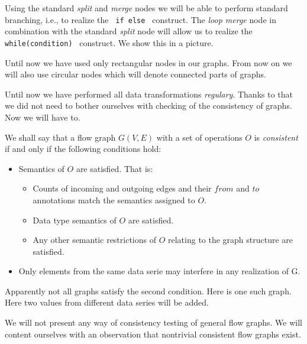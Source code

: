 Using the standard \emph{split} and \emph{merge} nodes we will be able to perform standard branching, i.e., to realize the \texttt{ if \string{\string} else \string{\string} } construct. The \emph{loop merge} node in combination with the standard \emph{split} node will allow us to realize the \texttt{ while(condition) \string{\string} } construct. We show this in a picture.

\begin{rem}
  Until now we have used only rectangular nodes in our graphs. From now on we will also use circular nodes which will denote connected parts of graphs.
\end{rem}


Until now we have performed all data transformations \emph{regulary}. Thanks to that we did not need to bother ourselves with checking of the consistency of graphs. Now we will have to.

\begin{define}
  We shall say that a flow graph $G(V,E)$ with a set of operations $O$ is \emph{consistent} if and only if the following conditions hold:
  \begin{itemize}
    \item Semantics of $O$ are satisfied. That is:
      \begin{itemize}
        \item Counts of incoming and outgoing edges and their $from$ and $to$ annotations match the semantics assigned to $O$.
        \item Data type semantics of $O$ are satisfied.
        \item Any other semantic restrictions of $O$ relating to the graph structure are satisfied. 
      \end{itemize}
    \item Only elements from the same data serie may interfere in any realization of G.
  \end{itemize}
\end{define}


Apparently not all graphs satisfy the second condition. Here is one such graph. Here two values from different data series will be added.

\FloatBarrier


\FloatBarrier

We will not present any way of consistency testing of general flow graphs. We will content ourselves with an observation that nontrivial consistent flow graphs exist.

